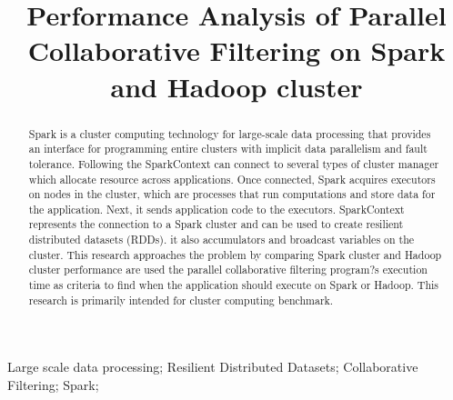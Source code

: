 \documentclass[conference]{IEEEtran}
\begin{document}
\title{Performance Analysis of Parallel Collaborative Filtering on Spark and Hadoop cluster}

\author{
\and
{}
}
\maketitle


\begin{abstract}
Spark is a cluster computing technology for large-scale data processing that provides an interface for programming entire clusters with implicit data parallelism and fault tolerance. Following the SparkContext can connect to several types of cluster manager which allocate resource across applications. Once connected, Spark acquires executors on nodes in the cluster, which are processes that run computations and store data for the application. Next, it sends application code to the executors. SparkContext represents the connection to a Spark cluster and can be used to create resilient distributed datasets (RDDs). it also accumulators and broadcast variables on the cluster. This research approaches the problem by comparing Spark cluster and Hadoop cluster performance are used the parallel collaborative filtering program?s execution time as criteria to find when the application should execute on Spark or Hadoop. This research is primarily intended for cluster computing benchmark.
\end{abstract}

\begin{IEEEkeywords}
Large scale data processing; Resilient Distributed Datasets; Collaborative Filtering; Spark;
\end{IEEEkeywords}
\end{document}
